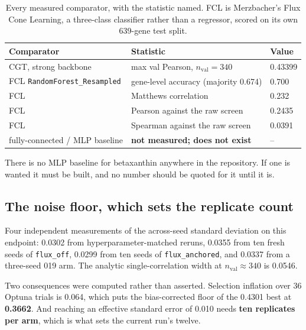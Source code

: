 \begin{table}[H]
  \centering
  \footnotesize
  \caption[Baselines]{Every measured comparator, with the statistic named. FCL is
  Merzbacher's Flux Cone Learning, a three-class classifier rather than a regressor, scored
  on its own 639-gene test split.}
  \label{tab:baselines}
  \begin{tabular}{@{}p{}p{}l@{}}
    \hline
    Comparator & Statistic & Value \\
    \hline
    CGT, strong backbone & max val Pearson, $n_{\mathrm{val}} = 340$ & 0.43399 \\
    FCL \texttt{RandomForest\_Resampled} & gene-level accuracy (majority 0.674) & 0.700 \\
    FCL & Matthews correlation & 0.232 \\
    FCL & Pearson against the raw screen & 0.2435 \\
    FCL & Spearman against the raw screen & 0.0391 \\
    fully-connected / MLP baseline & \textbf{not measured; does not exist} & -- \\
    \hline
  \end{tabular}
\end{table}

There is no MLP baseline for betaxanthin anywhere in the repository. If one is wanted it
must be built, and no number should be quoted for it until it is.

\subsection{The noise floor, which sets the replicate count}

Four independent measurements of the across-seed standard deviation on this endpoint:
0.0302 from hyperparameter-matched reruns, 0.0355 from ten fresh seeds of
\texttt{flux\_off}, 0.0299 from ten seeds of \texttt{flux\_anchored}, and 0.0337 from a
three-seed 019 arm. The analytic single-correlation width at $n_{\mathrm{val}} \approx 340$
is 0.0546.

Two consequences were computed rather than asserted. Selection inflation over 36 Optuna
trials is 0.064, which puts the bias-corrected floor of the 0.4301 best at \textbf{0.3662}.
And reaching an effective standard error of 0.010 needs \textbf{ten replicates per arm},
which is what sets the current run's twelve.

